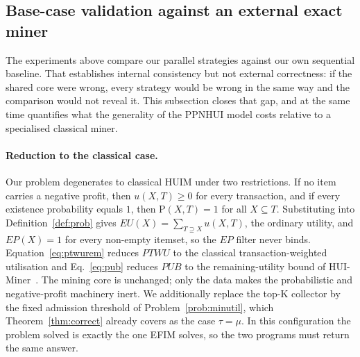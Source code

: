 \documentclass[pdflatex,sn-vancouver-num]{sn-jnl}
\theoremstyle{thmstyleone}%
\theoremstyle{thmstyletwo}%
\theoremstyle{thmstylethree}%
\newcommand{\uu}{u}
\newcommand{\EU}{\mathit{EU}}
\newcommand{\EP}{\mathit{EP}}
\newcommand{\PTWU}{\mathit{PTWU}}
\newcommand{\PUB}{\mathit{PUB}}
\newcommand{\itemset}{X}
\newcommand{\Kk}{\mathrm{K}}
\begin{document}
\subsection{Base-case validation against an external exact miner}
\label{subsec:basecase}
 
The experiments above compare our parallel strategies against our own
sequential baseline. That establishes internal consistency but not
external correctness: if the shared core were wrong, every strategy
would be wrong in the same way and the comparison would not reveal it.
This subsection closes that gap, and at the same time quantifies what
the generality of the PPNHUI model costs relative to a specialised
classical miner.
 
\paragraph{Reduction to the classical case.}
Our problem degenerates to classical HUIM under two restrictions. If no
item carries a negative profit, then $\uu(\itemset,T)\ge 0$ for every
transaction, and if every existence probability equals $1$, then
$\mathrm{P}(\itemset,T)=1$ for all $\itemset\subseteq T$. Substituting
into Definition~\ref{def:prob} gives $\EU(\itemset)=\sum_{T\supseteq
\itemset}\uu(\itemset,T)$, the ordinary utility, and $\EP(\itemset)=1$
for every non-empty itemset, so the $\EP$ filter never binds.
Equation~\eqref{eq:ptwurem} reduces $\PTWU$ to the classical
transaction-weighted utilisation and Eq.~\eqref{eq:pub} reduces $\PUB$
to the remaining-utility bound of HUI-Miner~\cite{liu2012huiminer}. The
mining core is unchanged; only the data makes the probabilistic and
negative-profit machinery inert. We additionally replace the top-$\Kk$
collector by the fixed admission threshold of
Problem~\ref{prob:minutil}, which Theorem~\ref{thm:correct} already
covers as the case $\tau=\mu$. In this configuration the problem solved
is exactly the one EFIM solves, so the two programs must return the same
answer.
 
\end{document}
